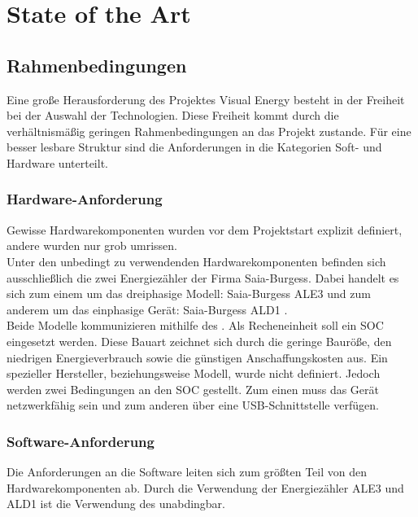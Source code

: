 \documentclass[../Bachelorarbeit.tex]{subfiles}
\begin{document}
\chapter{State of the Art}
\label{chap:state_of_the_art}

\section{Rahmenbedingungen}
Eine große Herausforderung des Projektes Visual Energy besteht in der Freiheit bei der Auswahl der Technologien. 
Diese Freiheit kommt durch die verhältnismäßig geringen Rahmenbedingungen an das Projekt zustande. 
Für eine besser lesbare Struktur sind die Anforderungen in die Kategorien Soft- und Hardware unterteilt.

\subsection{Hardware-Anforderung}
Gewisse Hardwarekomponenten wurden vor dem Projektstart explizit definiert, andere wurden nur grob umrissen.
\\
Unter den unbedingt zu verwendenden Hardwarekomponenten befinden sich ausschließlich die zwei Energiezähler der Firma Saia-Burgess.
Dabei handelt es sich zum einem um das dreiphasige Modell: Saia-Burgess \acs{ALE3} \parencite[vgl.][]{datenblatt_ale3} und zum anderem um das einphasige Gerät: Saia-Burgess \acs{ALD1} \parencite[vgl.][]{datenblatt_ald1}.  \\
Beide Modelle kommunizieren mithilfe des  . 
Als Recheneinheit soll ein \ac{SOC} eingesetzt werden. 
Diese Bauart zeichnet sich durch die geringe Bauröße, den niedrigen Energieverbrauch sowie die günstigen Anschaffungskosten aus. 
Ein spezieller Hersteller, beziehungsweise Modell, wurde nicht definiert. 
Jedoch werden zwei Bedingungen an den \ac{SOC} gestellt. 
Zum einen muss das Gerät netzwerkfähig sein und zum anderen über 
eine USB-Schnittstelle verfügen. 

\subsection{Software-Anforderung}
Die Anforderungen an die Software leiten sich zum größten Teil von den 
Hardwarekomponenten ab. Durch die Verwendung der Energiezähler \acs{ALE3} und \acs{ALD1} ist 
die Verwendung des  unabdingbar. 
\begin{comment}
Des Weiteren ist das verwendete Betriebssystem teilweise von der gewählten Hardwarearchitektur abhängig.
\end{comment}
\end{document}
